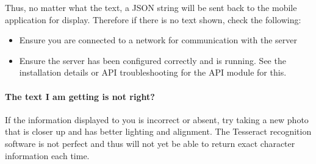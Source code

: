 \documentclass[12pt,a4paper]{article}
\begin{document}
    Thus, no matter what the text, a JSON string will be sent back to the mobile application for display. Therefore if there is no text shown, check the following: 
    \begin{itemize}
    \item Ensure you are connected to a network for communication with the server
    \item Ensure the server has been configured correctly and is running. See the installation details or API troubleshooting for the API module for this.
    \end{itemize}
    \paragraph{The text I am getting is not right? }
    If the information displayed to you is incorrect or absent, try taking a new photo that is closer up and has better lighting and alignment. The Tesseract recognition software is not perfect and thus will not yet be able to return exact character information each time. 
    \
   
\end{document}
